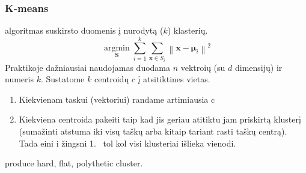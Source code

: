 \documentclass{VUMIFInfKursinis}
\begin{document}
		\subsubsection{K-means}
			 algoritmas suskirsto duomenis į nurodytą ($ k $) klasterių. \[ \underset{\mathbf{S}} {\operatorname{\arg \min}}  \sum_{i=1}^{k} \sum_{\mathbf x \in S_i} \left\| \mathbf x - \boldsymbol\mu_i \right\|^2 \]
			Praktikoje dažniausiai naudojamas duodama $n$ vektroių (su $d$ dimensijų) ir numeris $k$.  Sustatome $k$ centroidų $c$ į atsitiktines vietas.
			\begin{enumerate}
				\item Kiekvienam taskui (vektoriui) randame artimiausia c
				\item Kiekviena centroida pakeiti taip kad jis geriau atitiktu jam priskirtą klusterį (sumažinti atstuma iki visų taškų arba kitaip tariant rasti taškų centrą). Tada eini i žingsni  1.\ %
				tol kol visi klusteriai išlieka vienodi.
			\end{enumerate}
			 produce hard, flat, polythetic cluster. 

\end{document}
